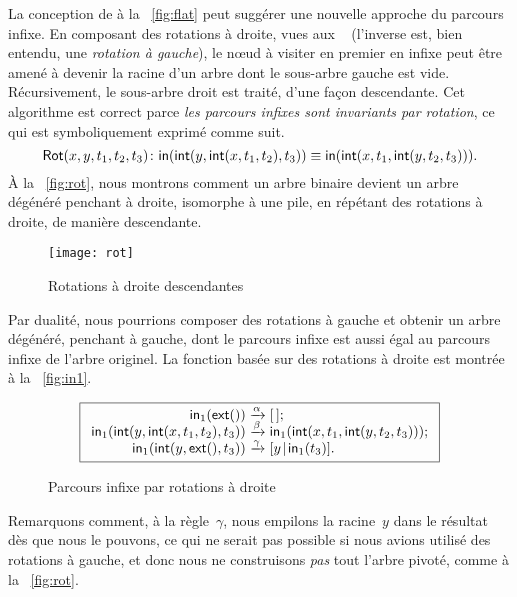 La conception de
 à la
\fig~\vref{fig:flat} peut suggérer une nouvelle approche du parcours
infixe. En composant des rotations à droite, vues aux \figs~
(l'inverse est, bien entendu, une \emph{rotation à gauche}), le
nœud à visiter en premier en infixe peut être amené à devenir la
racine d'un arbre dont le sous-arbre gauche est vide. Récursivement,
le sous-arbre droit est traité, d'une façon descendante. Cet
algorithme est correct parce \emph{les parcours infixes sont
  invariants par rotation}, ce qui est symboliquement exprimé comme
suit.
\begin{equation*}
\pred{Rot}{x,y,t_1,t_2,t_3} \colon
\fun{in}(\fun{int}(y,\fun{int}(x,t_1,t_2),t_3))
\equiv
\fun{in}(\fun{int}(x,t_1,\fun{int}(y,t_2,t_3))).\index{in@\fun{in/1}}
\label{def:Rot}
\end{equation*}
À la \fig~\vref{fig:rot}, nous montrons comment un arbre binaire
devient un arbre dégénéré
penchant à droite, isomorphe à une pile, en répétant des rotations à
droite, de manière descendante.
\begin{figure}[b]
\centering
\texttt{[image: rot]}
\caption{Rotations à droite descendantes}
\label{fig:rot}
\end{figure}
Par dualité, nous pourrions composer des rotations à gauche et obtenir
un arbre dégénéré, penchant à gauche, dont le parcours infixe est
aussi égal au parcours infixe de l'arbre originel. La fonction
 basée sur des rotations à
droite est montrée à la \fig~\vref{fig:in1}.
\begin{figure}
\begin{equation*}
\boxed{
\begin{array}{r@{\;}c@{\;}l}
\fun{in}_1(\fun{ext}()) & \xrightarrow{\smash{\alpha}} & \el;\\
\fun{in}_1(\fun{int}(y,\fun{int}(x,t_1,t_2),t_3))
  & \xrightarrow{\smash{\beta}} & \fun{in}_1(\fun{int}(x,t_1,\fun{int}(y,t_2,t_3)));\\
\fun{in}_1(\fun{int}(y,\fun{ext}(),t_3))
  & \xrightarrow{\smash{\gamma}} & \cons{y}{\fun{in}_1(t_3)}.
\end{array}}
\end{equation*}
\caption{Parcours infixe par rotations à droite}
\label{fig:in1}
\end{figure}
Remarquons comment, à la règle~\(\gamma\), nous empilons la
racine~\(y\) dans le résultat dès que nous le pouvons, ce qui ne
serait pas possible si nous avions utilisé des rotations à gauche, et
donc nous ne construisons \emph{pas} tout l'arbre pivoté, comme à la
\fig~\vref{fig:rot}.

